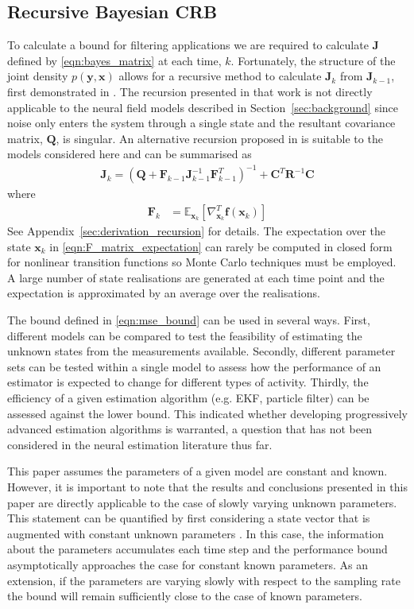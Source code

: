 \documentclass{article}
\renewcommand{\vec}[1]{\ensuremath{{\boldsymbol #1}}}
\newcommand{\mat}[1]{\ensuremath{\boldsymbol{#1}}}
\begin{document}
\subsection{Recursive Bayesian CRB}
To calculate a bound for filtering applications we are required to calculate $\mat J$ defined by \eqref{eqn:bayes_matrix} at each time, $k$. Fortunately, the structure of the joint density $p(\vec y,\vec x)$ allows for a recursive method to calculate $\mat J_k$ from $\mat J_{k-1}$, first demonstrated in \cite{Tichavsky1998}. The recursion presented in that work is not directly applicable to the neural field models described in Section~\ref{sec:background} since noise only enters the system through a single state and the resultant covariance matrix, $\mat Q$, is singular. An alternative recursion proposed in \cite{Bergman2001} is suitable to the models considered here and can be summarised as 
\begin{align}
	\mat J_k = \left( \mat Q + {\mat F}_{k-1} \mat J_{k-1}^{-1} {\mat F}_{k-1}^T\right)^{-1} + \mat C^T \mat R^{-1} \mat C
\end{align}
where
\begin{align}
		{\mat F}_k &= \mathbb E_{\vec x_k} \left[ \nabla_{\vec x_k}^T \vec f(\vec x_k)\right] 
		\label{eqn:F_matrix_expectation}
\end{align}
See Appendix~\ref{sec:derivation_recursion} for details. The expectation over the state $\vec x_k$ in \eqref{eqn:F_matrix_expectation} can rarely be computed in closed form for nonlinear transition functions so Monte Carlo techniques must be employed. A large number of state realisations are generated at each time point and the expectation is approximated by an average over the realisations.

The bound defined in \eqref{eqn:mse_bound} can be used in several ways. First, different models can be compared to test the feasibility of estimating the unknown states from the measurements available. Secondly, different parameter sets can be tested within a single model to assess how the performance of an estimator is expected to change for different types of activity. Thirdly, the efficiency of a given estimation algorithm (e.g. EKF, particle filter) can be assessed against the lower bound. This indicated whether developing progressively advanced estimation algorithms is warranted, a question that has not been considered in the neural estimation literature thus far.

This paper assumes the parameters of a given model are constant and known. However, it is important to note that the results and conclusions presented in this paper are directly applicable to the case of slowly varying unknown parameters. This statement can be quantified by first considering a state vector that is augmented with constant unknown parameters \cite{sdf}. In this case, the information about the parameters accumulates each time step and the performance bound asymptotically approaches the case for constant known parameters. As an extension, if the parameters are varying slowly with respect to the sampling rate the bound will remain sufficiently close to the case of known parameters.
\end{document}
